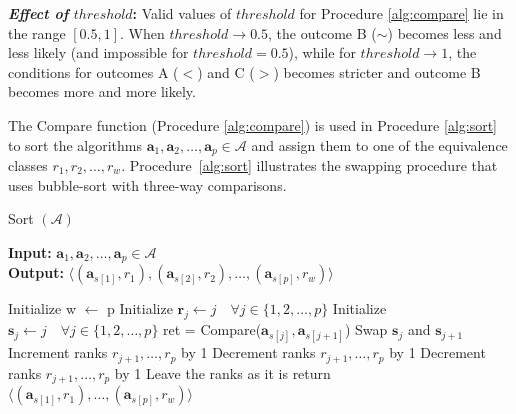 \documentclass[conference]{IEEEtran}
\begin{document}
\textbf{\textit{Effect of }$threshold$:} Valid values of $threshold$ for Procedure \ref{alg:compare} lie in the range $[0.5,1]$. When $threshold \to 0.5$, the outcome B ($\sim$) becomes
less and less likely (and impossible for $threshold=0.5$), while for $threshold \to 1$, the conditions for outcomes A ($<$)
and C ($>$) becomes stricter and outcome B becomes more and more likely. 

The Compare function (Procedure \ref{alg:compare}) is used in Procedure \ref{alg:sort} to sort the algorithms $\mathbf{a}_1,\mathbf{a}_2, \dots, \mathbf{a}_p \in \mathcal{A}$ and assign them to one of the equivalence classes $r_1, r_2, \dots, r_w$.
Procedure~\ref{alg:sort} illustrates the swapping procedure that uses bubble-sort\cite{bubblesort} with three-way comparisons.
\begin{algorithm}
	\caption{Sort $(\mathcal{A})$ }
	\label{alg:sort}
	\hspace*{\algorithmicindent} \textbf{Input: } $ \mathbf{a}_1,\mathbf{a}_2,\dots,\mathbf{a}_p \in \mathcal{A}$ \\
	\hspace*{\algorithmicindent} \textbf{Output: } $ \langle (\mathbf{a}_{s[1]},r_1), (\mathbf{a}_{s[2]}, r_2), \dots, (\mathbf{a}_{s[p]},r_w) \rangle $
	\begin{algorithmic}[1] 
		\State Initialize w $\leftarrow$ p
		\State Initialize $\mathbf{r}_j \leftarrow j \quad \forall j \in \{1,2,\dots,p\}$ 
		\State Initialize $\mathbf{s}_j \leftarrow j \quad \forall j \in \{1,2,\dots,p\}$ 
		\State ret = Compare($\mathbf{a}_{s[j]}, \mathbf{a}_{s[j+1]}$)
		\State Swap $\mathbf{s}_{j}$ and $\mathbf{s}_{j+1}$ \label{lst:swap}
		 \label{lst:h1}
		\State Increment ranks $r_{j+1}, \dots, r_p$ by 1 \label{lst:h2}
		\EndIf
		\Else
		 \label{lst:gg1}
		\State Decrement ranks $r_{j+1}, \dots, r_p$ by 1 \label{lst:gg2}
		\EndIf
		\EndIf
		 \label{lst:ag1}
		\State Decrement ranks $r_{j+1}, \dots, r_p$ by 1 \label{lst:ag2}
		\EndIf
		\State Leave the ranks as it is
		\EndIf		
		\EndFor
		\EndFor
		\State return $\langle (\mathbf{a}_{s[1]},r_1), \dots, (\mathbf{a}_{s[p]},r_w) \rangle$
              \end{algorithmic}
            \end{algorithm}
\end{document}
